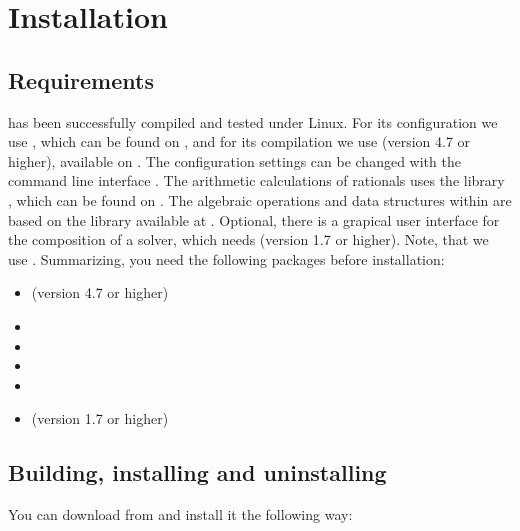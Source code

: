 \chapter{Installation}
\label{chapter:installation}
\section{Requirements}
\smtrat has been successfully compiled and tested under Linux. For its configuration we use \cmake, which can be found on \cmakeURL, and for its compilation we use \gplusplus (version 4.7 or higher), available on \gplusplusURL. The configuration settings can be changed with the command line interface \ccmake. The arithmetic calculations of rationals \smtrat uses the \Cpp library \Cln, which can be found on \clnURL. The algebraic operations and data structures within \smtrat are based on the \Cpp library \carl available at \carlURL. Optional, there is a grapical user interface for the composition of a solver, which needs \java (version 1.7 or higher). Note, that we use \Cppeleven. Summarizing, you need the following packages before installation:
\begin{itemize}
	\item \gplusplus (version 4.7 or higher)
	\item \cmake
	\item \ccmake
	\item \cln
	\item \carl
	\item \java (version 1.7 or higher)
\end{itemize}

\section{Building, installing and uninstalling \smtrat}
You can download \smtrat from \smtratURL and install it the following way:

